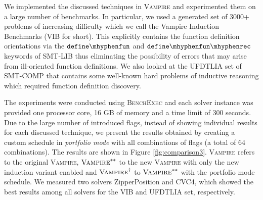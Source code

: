 We implemented the discussed techniques in \textsc{Vampire} and experimented them on a large number of benchmarks. In particular, we used a generated set of 3000+ problems of increasing difficulty which we call the Vampire Induction Benchmarks (VIB for short). This explicitly contains the function definition orientations via the $\mathtt{define\mhyphen fun}$ and $\mathtt{define\mhyphen fun\mhyphen rec}$ keywords of SMT-LIB thus eliminating the possibility of errors that may arise from ill-oriented function definitions. We also looked at the UFDTLIA set of SMT-COMP that contains some well-known hard problems of inductive reasoning which required function definition discovery. 

The experiments were conducted using \textsc{BenchExec} \cite{benchmarking,competitionresults} and each solver instance was provided one processor core, 16 GB of memory and a time limit of 300 seconds. Due to the large number of introduced flags, instead of showing individual results for each discussed technique, we present the results obtained by creating a custom schedule in \textit{portfolio mode} with all combinations of flags (a total of 64 combinations). The results are shown in Figure \ref{fig:comparison3}. \textsc{Vampire} refers to the original \textsc{Vampire}, $\textsc{Vampire}^{\ast\ast}$ to the new \textsc{Vampire} with only the new induction variant enabled and $\textsc{Vampire}^{\dag}$ to $\textsc{Vampire}^{\ast\ast}$ with the portfolio mode schedule. We measured two solvers ZipperPosition and CVC4, which showed the best results among all solvers for the VIB and UFDTLIA set, respectively.

